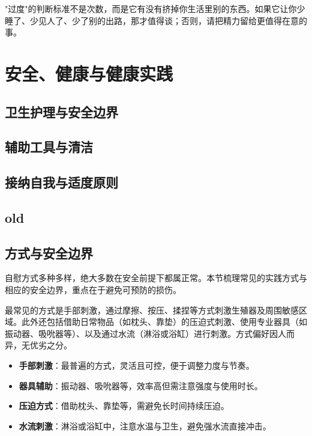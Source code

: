\documentclass[12pt,UTF8]{ctexbook}
\newcommand{\keyword}[1]{\textbf{#1}}
\begin{document}
\begin{tcolorbox}[colback=pink!5!white,colframe=red!50!black,title=贴心小叮咛]
	"过度"的判断标准不是次数，而是它有没有挤掉你生活里别的东西。如果它让你少睡了、少见人了、少了别的出路，那才值得谈；否则，请把精力留给更值得在意的事。
\end{tcolorbox}

\section{安全、健康与健康实践}

\subsection{卫生护理与安全边界}

\subsection{辅助工具与清洁}

\subsection{接纳自我与适度原则}

\subsection{old}

\subsection{方式与安全边界}

自慰方式多种多样，绝大多数在安全前提下都属正常。本节梳理常见的实践方式与相应的安全边界，重点在于避免可预防的损伤。

最常见的方式是手部刺激，通过摩擦、按压、揉捏等方式刺激生殖器及周围敏感区域。此外还包括借助日常物品（如枕头、靠垫）的压迫式刺激、使用专业器具（如振动器、吸吮器等）、以及通过水流（淋浴或浴缸）进行刺激。方式偏好因人而异，无优劣之分。

\begin{itemize}
	\item \keyword{手部刺激}：最普遍的方式，灵活且可控，便于调整力度与节奏。
	\item \keyword{器具辅助}：振动器、吸吮器等，效率高但需注意强度与使用时长。
	\item \keyword{压迫方式}：借助枕头、靠垫等，需避免长时间持续压迫。
	\item \keyword{水流刺激}：淋浴或浴缸中，注意水温与卫生，避免强水流直接冲击。
\end{itemize}
\end{document}
